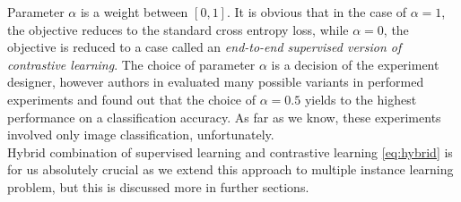 Parameter $\alpha$ is a weight between $\left[0,1\right]$. It is obvious that in the case of $\alpha = 1$, the objective reduces to the standard cross entropy loss, while $\alpha = 0$, the objective is reduced to a case called an \emph{end-to-end supervised version of contrastive learning}. The choice of parameter $\alpha$ is a decision of the experiment designer, however authors in \cite{HDGEmain} evaluated many possible variants in performed experiments and found out that the choice of $\alpha=0.5$ yields to the highest performance on a classification accuracy. As far as we know, these experiments involved only image classification, unfortunately. \\
Hybrid combination of supervised learning and contrastive learning \eqref{eq:hybrid} is for us absolutely crucial as we extend this approach to multiple instance learning problem, but this is discussed more in further sections.  


